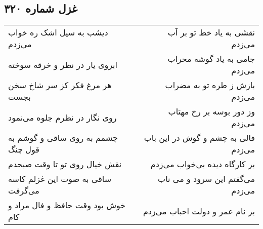 \begin{center}
\section*{غزل شماره ۳۲۰}
\label{sec:sh320}
\begin{longtable}{l p{0.5cm} r}
دیشب به سیل اشک ره خواب می‌زدم
&&
نقشی به یاد خط تو بر آب می‌زدم
\\
ابروی یار در نظر و خرقه سوخته
&&
جامی به یاد گوشه محراب می‌زدم
\\
هر مرغ فکر کز سر شاخ سخن بجست
&&
بازش ز طره تو به مضراب می‌زدم
\\
روی نگار در نظرم جلوه می‌نمود
&&
وز دور بوسه بر رخ مهتاب می‌زدم
\\
چشمم به روی ساقی و گوشم به قول چنگ
&&
فالی به چشم و گوش در این باب می‌زدم
\\
نقش خیال روی تو تا وقت صبحدم
&&
بر کارگاه دیده بی‌خواب می‌زدم
\\
ساقی به صوت این غزلم کاسه می‌گرفت
&&
می‌گفتم این سرود و می ناب می‌زدم
\\
خوش بود وقت حافظ و فال مراد و کام
&&
بر نام عمر و دولت احباب می‌زدم
\\
\end{longtable}
\end{center}
